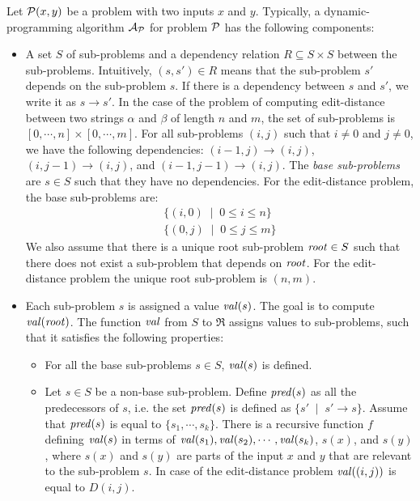 Let ${\cal P}(x,y)$ be a problem with two inputs $x$ and $y$. Typically,
a dynamic-programming algorithm ${\cal A}_{{\cal P}}$ for problem
${\cal P}$ has the following components: 
\begin{itemize}
\item A set $S$ of sub-problems and a dependency relation $R\subseteq S\times S$
between the sub-problems. Intuitively, $(s,s')\in R$ means that the
sub-problem $s'$ depends on the sub-problem $s$. If there is a dependency
between $s$ and $s'$, we write it as $s\rightarrow s'$. In the
case of the problem of computing edit-distance between two strings
$\alpha$ and $\beta$ of length $n$ and $m$, the set of sub-problems
is $[0,\cdots,n]\times[0,\cdots,m]$. For all sub-problems $(i,j)$
such that $i\not=0$ and $j\not=0$, we have the following dependencies:
$(i-1,j)\rightarrow(i,j)$, $(i,j-1)\rightarrow(i,j)$, and $(i-1,j-1)\rightarrow(i,j)$.
The \textit{base sub-problems} are $s\in S$ such that they have no
dependencies. For the edit-distance problem, the base sub-problems
are: \[
\begin{array}{l}
\{(i,0)\;\mid\;0\leq i\leq n\}\\
\{(0,j)\;\mid\;0\leq j\leq m\}\end{array}\]
 We also assume that there is a unique root sub-problem ${\it root}\in S$
such that there does not exist a sub-problem that depends on ${\it root}$.
For the edit-distance problem the unique root sub-problem is $(n,m)$. 
\item Each sub-problem $s$ is assigned a value ${\it val}(s)$. The goal
is to compute ${\it val}({\it root})$. The function ${\it val}$
from $S$ to $\Re$ assigns values to sub-problems, such that it satisfies
the following properties:

\begin{itemize}
\item For all the base sub-problems $s\in S$, ${\it val}(s)$ is defined. 
\item Let $s\in S$ be a non-base sub-problem. Define ${\it pred}(s)$ as
all the predecessors of $s$, i.e. the set ${\it pred}(s)$ is defined
as $\{s'\;\mid\; s'\rightarrow s\}$. Assume that ${\it pred}(s)$
is equal to $\{s_{1},\cdots,s_{k}\}$. There is a recursive function
$f$ defining ${\it val}(s)$ in terms of ${\it val}(s_{1}),{\it val}(s_{2}),\cdots,{\it val}(s_{k})$,
$s(x)$, and $s(y)$, where $s(x)$ and $s(y)$ are parts of the input
$x$ and $y$ that are relevant to the sub-problem $s$. In case of
the edit-distance problem ${\it val}((i,j))$ is equal to $D(i,j)$. 
\end{itemize}
\end{itemize}
